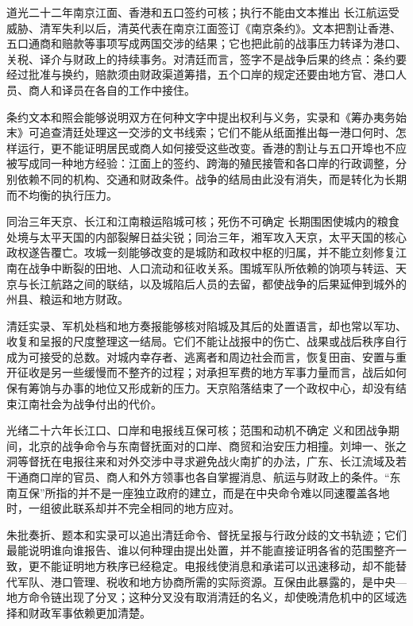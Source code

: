 \begin{event}{}{道光二十二年}{南京江面、香港和五口}{签约可核；执行不能由文本推出}
长江航运受威胁、清军失利以后，清英代表在南京江面签订《南京条约》。文本把割让香港、五口通商和赔款等事项写成两国交涉的结果；它也把此前的战事压力转译为港口、关税、译介与财政上的持续事务。对清廷而言，签字不是战争后果的终点：条约要经过批准与换约，赔款须由财政渠道筹措，五个口岸的规定还要由地方官、港口人员、商人和译员在各自的工作中接住。

条约文本和照会能够说明双方在何种文字中提出权利与义务，实录和《筹办夷务始末》可追查清廷处理这一交涉的文书线索；它们不能从纸面推出每一港口何时、怎样运行，更不能证明居民或商人如何接受这些改变。香港的割让与五口开埠也不应被写成同一种地方经验：江面上的签约、跨海的殖民接管和各口岸的行政调整，分别依赖不同的机构、交通和财政条件。战争的结局由此没有消失，而是转化为长期而不均衡的执行压力。
\end{event}
\begin{event}{}{同治三年}{天京、长江和江南粮运}{陷城可核；死伤不可确定}
长期围困使城内的粮食处境与太平天国的内部裂解日益尖锐；同治三年，湘军攻入天京，太平天国的核心政权遂告覆亡。攻城一刻能够改变的是城防和政权中枢的归属，并不能立刻修复江南在战争中断裂的田地、人口流动和征收关系。围城军队所依赖的饷项与转运、天京与长江航路之间的联结，以及城陷后人员的去留，都使战争的后果延伸到城外的州县、粮运和地方财政。

清廷实录、军机处档和地方奏报能够核对陷城及其后的处置语言，却也常以军功、收复和呈报的尺度整理这一结局。它们不能让战报中的伤亡、战果或战后秩序自行成为可接受的总数。对城内幸存者、逃离者和周边社会而言，恢复田亩、安置与重开征收是另一些缓慢而不整齐的过程；对承担军费的地方军事力量而言，战后如何保有筹饷与办事的地位又形成新的压力。天京陷落结束了一个政权中心，却没有结束江南社会为战争付出的代价。
\end{event}
\begin{event}{}{光绪二十六年}{长江口、口岸和电报线}{互保可核；范围和动机不确定}
义和团战争期间，北京的战争命令与东南督抚面对的口岸、商贸和治安压力相撞。刘坤一、张之洞等督抚在电报往来和对外交涉中寻求避免战火南扩的办法，广东、长江流域及若干通商口岸的官员、商人和外方领事也各自掌握消息、航运与财政上的条件。“东南互保”所指的并不是一座独立政府的建立，而是在中央命令难以同速覆盖各地时，一组彼此联系却并不完全相同的地方应对。

朱批奏折、题本和实录可以追出清廷命令、督抚呈报与行政分歧的文书轨迹；它们最能说明谁向谁报告、谁以何种理由提出处置，并不能直接证明各省的范围整齐一致，更不能证明地方秩序已经稳定。电报线使消息和承诺可以迅速移动，却不能替代军队、港口管理、税收和地方协商所需的实际资源。互保由此暴露的，是中央—地方命令链出现了分叉；这种分叉没有取消清廷的名义，却使晚清危机中的区域选择和财政军事依赖更加清楚。
\end{event}

